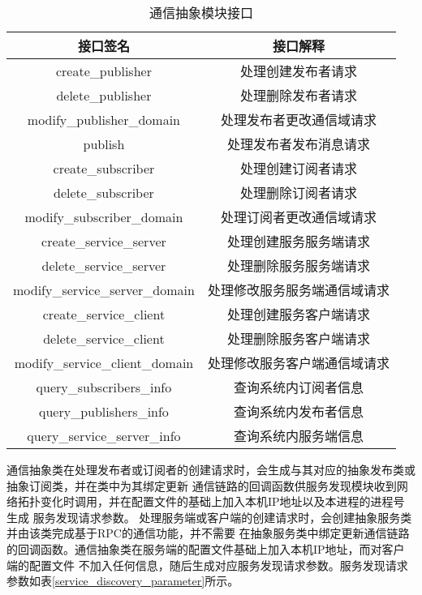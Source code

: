 \begin{table}[htb]
  \centering\small
  \caption{通信抽象模块接口}
  \renewcommand\arraystretch{1.2}
  \label{communication_abstract_interface}
  \begin{tabular}{cc}
    \toprule
    接口签名 & 接口解释 \\
    \midrule
    create\_publisher & 处理创建发布者请求\\
    delete\_publisher & 处理删除发布者请求\\
    modify\_publisher\_domain & 处理发布者更改通信域请求\\
    publish & 处理发布者发布消息请求 \\
    create\_subscriber & 处理创建订阅者请求\\
    delete\_subscriber & 处理删除订阅者请求\\
    modify\_subscriber\_domain & 处理订阅者更改通信域请求\\ 
    create\_service\_server & 处理创建服务服务端请求\\
    delete\_service\_server & 处理删除服务服务端请求\\
    modify\_service\_server\_domain & 处理修改服务服务端通信域请求\\
    create\_service\_client & 处理创建服务客户端请求\\
    delete\_service\_client & 处理删除服务客户端请求\\
    modify\_service\_client\_domain & 处理修改服务客户端通信域请求\\
    query\_subscribers\_info & 查询系统内订阅者信息\\
    query\_publishers\_info & 查询系统内发布者信息\\
    query\_service\_server\_info & 查询系统内服务端信息\\
    \bottomrule
  \end{tabular}
\end{table}

通信抽象类在处理发布者或订阅者的创建请求时，会生成与其对应的抽象发布类或抽象订阅类，并在类中为其绑定更新
通信链路的回调函数供服务发现模块收到网络拓扑变化时调用，并在配置文件的基础上加入本机IP地址以及本进程的进程号生成
服务发现请求参数。
处理服务端或客户端的创建请求时，会创建抽象服务类并由该类完成基于RPC的通信功能，并不需要
在抽象服务类中绑定更新通信链路的回调函数。通信抽象类在服务端的配置文件基础上加入本机IP地址，而对客户端的配置文件
不加入任何信息，随后生成对应服务发现请求参数。服务发现请求参数如表\ref{service_discovery_parameter}所示。

